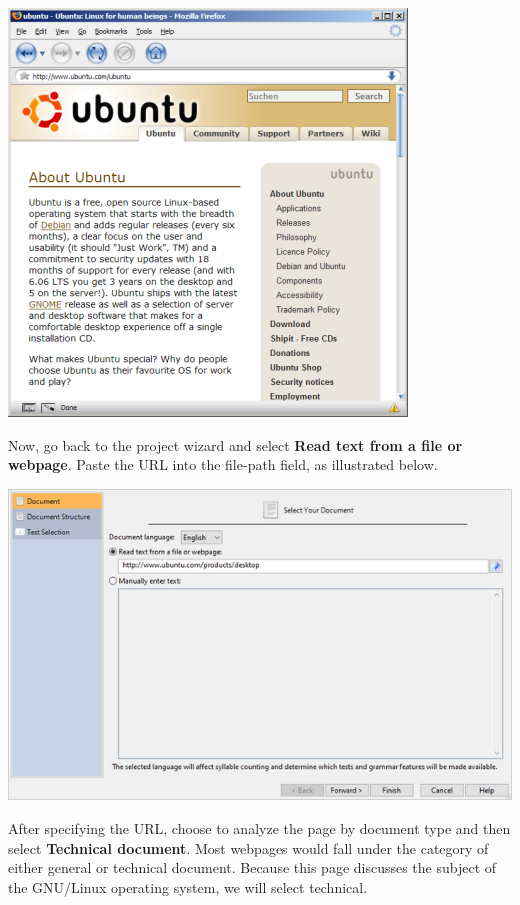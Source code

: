 \documentclass[
]{book}
\theoremstyle{definition}
\theoremstyle{definition}
\theoremstyle{definition}
\theoremstyle{definition}
\theoremstyle{remark}
\begin{document}
\begin{center}\includegraphics[width=0.75\linewidth,]{Images/NonGenerated/webbrowser} \end{center}

Now, go back to the project wizard and select \textbf{Read text from a file or webpage}. Paste the URL into the file-path field, as illustrated below.

\includegraphics{Images/webpath.png}

After specifying the URL, choose to analyze the page by document type and then select \textbf{Technical document}. Most webpages would fall under the category of either general or technical document. Because this page discusses the subject of the GNU/Linux operating system, we will select technical.
\end{document}
